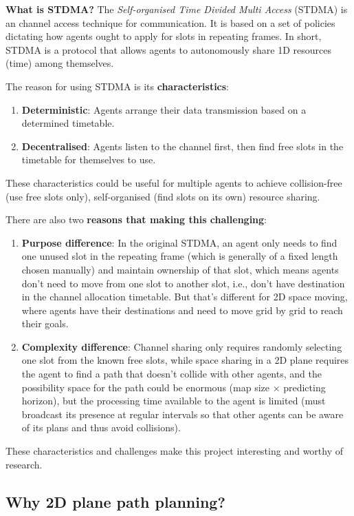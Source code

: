 \textbf{What is STDMA?} The \textit{Self-organised Time Divided Multi Access} (STDMA)
 is an channel access technique for communication. 
 It is based on a set of policies dictating how agents ought to apply for
  slots in repeating frames. 
  In short, STDMA is a protocol that allows agents to autonomously
   share 1D resources (time) among themselves.

The reason for using STDMA is its \textbf{characteristics}:

\begin{enumerate}
    \item \textbf{Deterministic}: Agents arrange their data transmission based on a determined timetable.
    \item \textbf{Decentralised}: Agents listen to the channel first, then find free slots in the timetable for themselves to use.
\end{enumerate}

These characteristics could be useful for multiple agents to achieve collision-free (use free slots only),
 self-organised (find slots on its own) resource sharing.

There are also two \textbf{reasons that making this challenging}: 

\begin{enumerate}
    \item \textbf{Purpose difference}: In the original STDMA, an agent only needs to find one unused slot
    in the repeating frame (which is generally of a fixed length chosen manually) and maintain ownership of that slot,
    which means agents don't need to move from one slot to another slot, i.e., don't have destination in the channel allocation timetable. 
    But that's different for 2D space moving, where agents have their destinations and need to move grid by grid to reach their goals.
    \item \textbf{Complexity difference}: Channel sharing only requires randomly selecting one slot from the known free slots, while space sharing in
     a 2D plane requires the agent to find a path that doesn't collide with other agents, and the possibility space for the path could be enormous
      (map size $\times$ predicting horizon), but the processing time available to the agent is limited
       (must broadcast its presence at regular intervals so that other agents can be aware of its plans and thus avoid collisions).
\end{enumerate}


These characteristics and challenges make this project interesting and worthy of research.


\subsection{Why 2D plane path planning?}